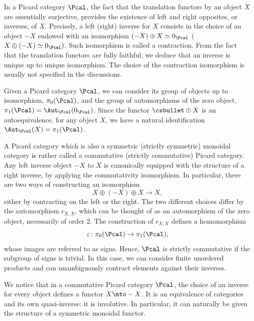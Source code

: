 In a Picard category $\Pcal$, the fact that the translation functors by an object $X$ are essentially surjective, provides the existence of left and right opposites, or inverses, of $X$. Precisely, a left (\resp right) inverse for $X$ consists in the choice of an object $-X$ endowed with an isomorphism $(-X)\oplus X\simeq 0_{\Pcal}$ (\resp $X\oplus (-X)\simeq 0_{\Pcal})$. Such isomorphism is called a contraction. From the fact that the translation functors are fully faithful, we deduce that an inverse is unique up to unique isomorphism. The choice of the contraction isomorphism is usually not specified in the discussions.

Given a Picard category $\Pcal$, we can consider its group of objects up to isomorphism, $\pi_0(\Pcal)$, and the group of automorphisms of the zero object, $\pi_1(\Pcal) = \Aut_{\Pcal}(0_{\Pcal})$. Since the functor $\csbullet \oplus X$ is an autoequivalence, for any object $X$, we have a natural identification $\Aut_{\Pcal}(X) = \pi_1(\Pcal)$.

A Picard category which is also a symmetric (\resp strictly symmetric) monoidal category is rather called a commutative (\resp strictly commutative) Picard category. Any left inverse object $-X$ to $X$ is canonically equipped with the structure of a right inverse, by applying the commutativity isomorphism. In particular, there are two ways of constructing an isomorphism
\begin{displaymath}
X \oplus (-X) \oplus X \to X,
\end{displaymath}
either by contracting on the left or the right. The two different choices differ by the automorphism $c_{X,X}$, which can be thought of as an automorphism of the zero object, necessarily of order 2. The construction of $c_{X,X}$ defines a homomorphism
\begin{equation}\label{eq:isawthesign}
\varepsilon \colon \pi_0(\Pcal) \to \pi_1(\Pcal),
\end{equation}
whose images are referred to as signs. Hence, $\Pcal$ is strictly commutative if the subgroup of signs is trivial. In this case, we can consider finite unordered products and can unambiguously contract elements against their inverses.

We notice that in a commutative Picard category $\Pcal$, the choice of an inverse for every object defines a functor $X\mto -X$. It is an equivalence of categories and its own quasi-inverse: it is involutive. In particular, it can naturally be given the structure of a symmetric monoidal functor.

